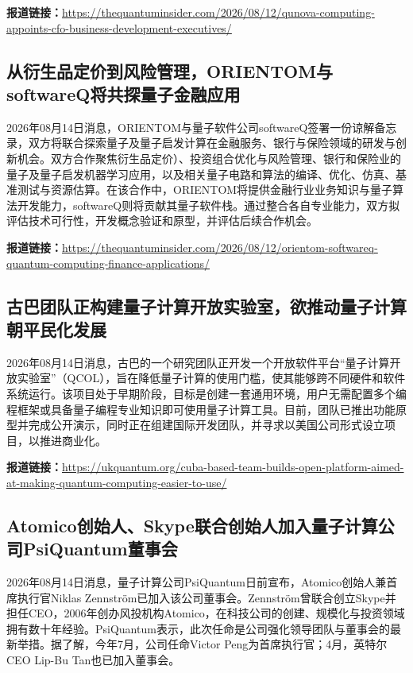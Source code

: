 \documentclass[12pt,a4paper]{ctexart}
\begin{document}
\noindent\textbf{报道链接：}\url{https://thequantuminsider.com/2026/08/12/qunova-computing-appoints-cfo-business-development-executives/}

\subsection{ 从衍生品定价到风险管理，ORIENTOM与softwareQ将共探量子金融应用 }

2026年08月14日消息，ORIENTOM与量子软件公司softwareQ签署一份谅解备忘录，双方将联合探索量子及量子启发计算在金融服务、银行与保险领域的研发与创新机会。双方合作聚焦衍生品定价）、投资组合优化与风险管理、银行和保险业的量子及量子启发机器学习应用，以及相关量子电路和算法的编译、优化、仿真、基准测试与资源估算。在该合作中，ORIENTOM将提供金融行业业务知识与量子算法开发能力，softwareQ则将贡献其量子软件栈。通过整合各自专业能力，双方拟评估技术可行性，开发概念验证和原型，并评估后续合作机会。

\noindent\textbf{报道链接：}\url{https://thequantuminsider.com/2026/08/12/orientom-softwareq-quantum-computing-finance-applications/}

\subsection{ 古巴团队正构建量子计算开放实验室，欲推动量子计算朝平民化发展 }

2026年08月14日消息，古巴的一个研究团队正开发一个开放软件平台“量子计算开放实验室”（QCOL），旨在降低量子计算的使用门槛，使其能够跨不同硬件和软件系统运行。该项目处于早期阶段，目标是创建一套通用环境，用户无需配置多个编程框架或具备量子编程专业知识即可使用量子计算工具。目前，团队已推出功能原型并完成公开演示，同时正在组建国际开发团队，并寻求以美国公司形式设立项目，以推进商业化。

\noindent\textbf{报道链接：}\url{https://ukquantum.org/cuba-based-team-builds-open-platform-aimed-at-making-quantum-computing-easier-to-use/}

\subsection{ Atomico创始人、Skype联合创始人加入量子计算公司PsiQuantum董事会 }

2026年08月14日消息，量子计算公司PsiQuantum日前宣布，Atomico创始人兼首席执行官Niklas Zennström已加入该公司董事会。Zennström曾联合创立Skype并担任CEO，2006年创办风投机构Atomico，在科技公司的创建、规模化与投资领域拥有数十年经验。PsiQuantum表示，此次任命是公司强化领导团队与董事会的最新举措。据了解，今年7月，公司任命Victor Peng为首席执行官；4月，英特尔CEO Lip-Bu Tan也已加入董事会。
\end{document}
